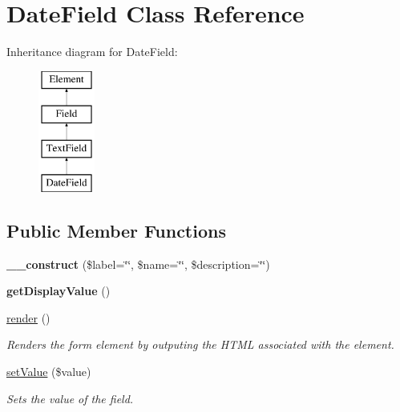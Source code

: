 \hypertarget{class_date_field}{
\section{DateField Class Reference}
\label{class_date_field}
}
Inheritance diagram for DateField:\begin{figure}[H]
\begin{center}
\leavevmode
\includegraphics[height=4.000000cm]{class_date_field}
\end{center}
\end{figure}
\subsection*{Public Member Functions}
\begin{DoxyCompactItemize}
\item 
\hypertarget{class_date_field_a2da3c6d82e6f885e63058239086b2fac}{
{\bfseries \_\-\_\-construct} (\$label=\char`\"{}\char`\"{}, \$name=\char`\"{}\char`\"{}, \$description=\char`\"{}\char`\"{})}
\label{class_date_field_a2da3c6d82e6f885e63058239086b2fac}

\item 
\hypertarget{class_date_field_ad7853e6ffadb3d59651c89f23e98a30e}{
{\bfseries getDisplayValue} ()}
\label{class_date_field_ad7853e6ffadb3d59651c89f23e98a30e}

\item 
\hyperlink{class_date_field_a4abe10a34dd34fcc46fb47e1db387757}{render} ()
\begin{DoxyCompactList}\small\item\em Renders the form element by outputing the HTML associated with the element. \item\end{DoxyCompactList}\item 
\hyperlink{class_date_field_a4afdc1531fd831eb69995b3298b5b222}{setValue} (\$value)
\begin{DoxyCompactList}\small\item\em Sets the value of the field. \item\end{DoxyCompactList}\end{DoxyCompactItemize}


